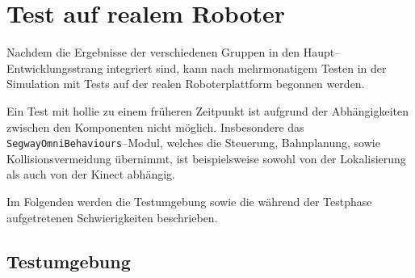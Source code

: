 
\chapter{Test auf realem Roboter}
\authorsection{\editortobias}



Nachdem die Ergebnisse der verschiedenen Gruppen in den Haupt--Entwicklungsstrang integriert sind, kann nach mehrmonatigem Testen in der Simulation mit Tests auf der realen Roboterplattform begonnen werden.

Ein Test mit \gls{hollie} zu einem früheren Zeitpunkt ist aufgrund der Abhängigkeiten zwischen den Komponenten nicht möglich.
Insbesondere das \lstinline{SegwayOmniBehaviours}--Modul, welches die Steuerung, Bahnplanung, sowie Kollisionsvermeidung übernimmt, ist beispielsweise sowohl von der Lokalisierung als auch von der Kinect abhängig.

Im Folgenden werden die Testumgebung sowie die während der Testphase aufgetretenen Schwierigkeiten beschrieben.


\section{Testumgebung}


